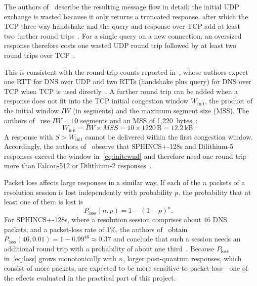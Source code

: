 \documentclass[conference]{IEEEtran}
\begin{document}
The authors of~\cite{turbodns} describe the resulting message flow in detail:
the initial UDP exchange is wasted because it only returns a truncated
response, after which the TCP three-way handshake and the query and response
over TCP add at least two further round trips~\cite{turbodns}. For a single
query on a new connection, an oversized response therefore costs one wasted
UDP round trip followed by at least two round trips over TCP~\cite{turbodns}.

This is consistent with the round-trip counts reported in~\cite{doqfirstlook},
whose authors expect one RTT for DNS over UDP and two RTTs (handshake plus
query) for DNS over TCP when TCP is used directly~\cite{doqfirstlook}. A
further round trip can be added when a response does not fit into the TCP
initial congestion window $W_\text{init}$, the product of the initial window
$\mathit{IW}$ (in segments) and the maximum segment size (MSS). The authors
of~\cite{turbodns} use $\mathit{IW} = 10$ segments and an MSS of
1,220~bytes~\cite{turbodns}:
\begin{equation}
W_\text{init} = \mathit{IW} \times \mathit{MSS} = 10 \times 1220\,\text{B}
= 12.2\,\text{kB}.
\label{eq:initcwnd}
\end{equation}
A response with $S > W_\text{init}$ cannot be delivered within the first
congestion window. Accordingly, the authors of~\cite{turbodns} observe that
SPHINCS+-128s and Dilithium-5 responses exceed the window
in~\eqref{eq:initcwnd} and therefore need one round trip more than Falcon-512
or Dilithium-2 responses~\cite{turbodns}.

Packet loss affects large responses in a similar way. If each of the $n$
packets of a resolution session is lost independently with probability $p$,
the probability that at least one of them is lost is
\begin{equation}
P_\text{loss}(n, p) = 1 - (1 - p)^{n}.
\label{eq:loss}
\end{equation}
For SPHINCS+-128s, where a resolution session comprises about 46 DNS packets,
and a packet-loss rate of 1\%, the authors of~\cite{turbodns} obtain
$P_\text{loss}(46, 0.01) = 1 - 0.99^{46} \approx 0.37$ and conclude that such
a session needs an additional round trip with a probability of about one
third~\cite{turbodns}. Because $P_\text{loss}$ in~\eqref{eq:loss} grows
monotonically with $n$, larger post-quantum responses, which consist of more
packets, are expected to be more sensitive to packet loss---one of the effects
evaluated in the practical part of this project.
\end{document}
